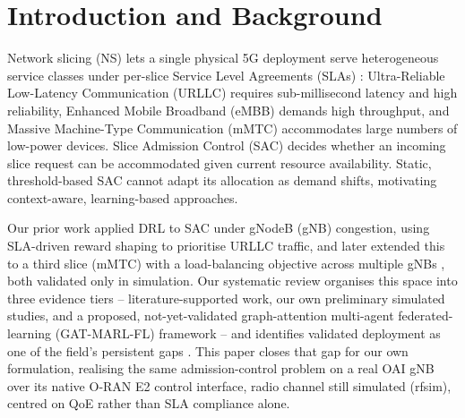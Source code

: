 \documentclass[conference]{IEEEtran}
\begin{document}
\section{Introduction and Background}
Network slicing (NS) lets a single physical 5G deployment serve
heterogeneous service classes under per-slice Service Level
Agreements (SLAs) \cite{slicing-survey}: Ultra-Reliable Low-Latency Communication (URLLC)
requires sub-millisecond latency and high reliability, Enhanced
Mobile Broadband (eMBB) demands high throughput, and Massive
Machine-Type Communication (mMTC) accommodates large numbers of
low-power devices. Slice Admission Control (SAC) decides whether an
incoming slice request can be accommodated given current resource
availability. Static, threshold-based SAC cannot adapt its
allocation as demand shifts, motivating context-aware, learning-based
approaches.

Our prior work applied DRL to SAC under gNodeB (gNB) congestion,
using SLA-driven reward shaping to prioritise URLLC traffic, and
later extended this to a third slice (mMTC) with a load-balancing
objective across multiple gNBs \cite{mecon-paper1,icraie-paper2},
both validated only in simulation. Our systematic review organises
this space into three evidence tiers -- literature-supported work, our
own preliminary simulated studies, and a proposed, not-yet-validated
graph-attention multi-agent federated-learning (GAT-MARL-FL)
framework -- and identifies validated deployment as one of the field's
persistent gaps \cite{survey-paper3}. This paper closes that gap for
our own formulation, realising the same admission-control problem on
a real OAI gNB over its native O-RAN \cite{oran-architecture} E2
control interface, radio channel still simulated (rfsim), centred on
QoE rather than SLA compliance alone.
\end{document}
